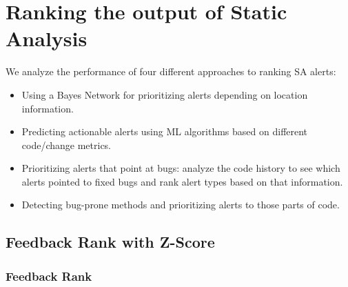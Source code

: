 
\section{Ranking the output of Static Analysis}\label{sec:ranking}


We analyze the performance of four different approaches to ranking SA alerts:
\begin{itemize}
	\item Using a Bayes Network for prioritizing alerts depending on location information.
	\item Predicting actionable alerts using ML algorithms based on different code/change metrics.
	\item Prioritizing alerts that point at bugs: analyze the code history to see which alerts pointed to fixed bugs and rank alert types based on that information.
	\item Detecting bug-prone methods and prioritizing alerts to those parts of code.
\end{itemize}

\subsection{Feedback Rank with Z-Score}
\label{method:fbrank}

\subsubsection{Feedback Rank}

